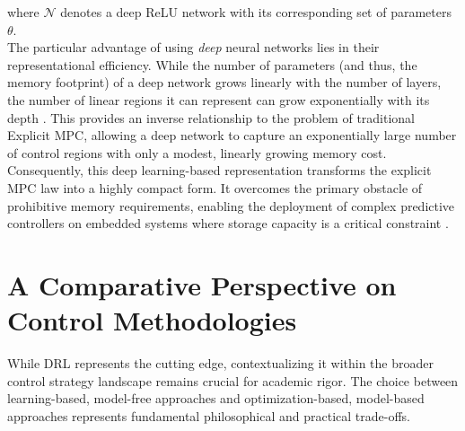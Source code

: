 where $\mathcal{N}$ denotes a deep ReLU network with its corresponding set of parameters $\theta$.
\\
\noindent
The particular advantage of using \textit{deep} neural networks lies in their representational efficiency. While the number of parameters (and thus, the memory footprint) of a deep network grows linearly with the number of layers, the number of linear regions it can represent can grow exponentially with its depth \cite{karg2020efficient}. This provides an inverse relationship to the problem of traditional Explicit MPC, allowing a deep network to capture an exponentially large number of control regions with only a modest, linearly growing memory cost.
\\
\noindent
Consequently, this deep learning-based representation transforms the explicit MPC law into a highly compact form. It overcomes the primary obstacle of prohibitive memory requirements, enabling the deployment of complex predictive controllers on embedded systems where storage capacity is a critical constraint \cite{karg2020efficient}.
\section{A Comparative Perspective on Control Methodologies}

While DRL represents the cutting edge, contextualizing it within the broader control strategy landscape remains crucial for academic rigor. The choice between learning-based, model-free approaches and optimization-based, model-based approaches represents fundamental philosophical and practical trade-offs.


